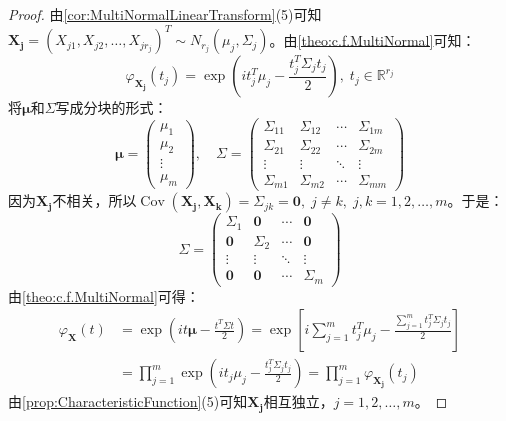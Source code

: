\begin{proof}
	由\cref{cor:MultiNormalLinearTransform}(5)可知$\mathbf{X_j}=(X_{j1},X_{j2},\dots,X_{jr_j})^T\sim N_{r_j}(\mu_j,\Sigma_j)$。由\cref{theo:c.f.MultiNormal}可知：
	\begin{equation*}
		\varphi_\mathbf{X_j}(t_j)=\exp\left(it_j^T\mu_j-\frac{t_j^T\Sigma_j t_j}{2}\right),\;t_j\in\mathbb{R}^{r_j}
	\end{equation*}
	将$\boldsymbol{\mu}$和$\Sigma$写成分块的形式：
	\begin{equation*}
		\boldsymbol{\mu}=
		\begin{pmatrix} 
			\mu_1 \\ 
			\mu_2 \\ 
			\vdots \\ 
			\mu_m 
		\end{pmatrix},\quad
		\Sigma=
		\begin{pmatrix}
			\Sigma_{11} & \Sigma_{12} & \cdots & \Sigma_{1m} \\
			\Sigma_{21} & \Sigma_{22} & \cdots & \Sigma_{2m} \\
			\vdots & \vdots & \ddots & \vdots \\
			\Sigma_{m1} & \Sigma_{m2} & \cdots & \Sigma_{mm}
		\end{pmatrix}
	\end{equation*}
	因为$\mathbf{X_j}$不相关，所以$\operatorname{Cov}(\mathbf{X_j},\mathbf{X_k})=\Sigma_{jk}=\mathbf{0},\;j\ne k,\;j,k=1,2,\dots,m$。于是：
	\begin{equation*}
		\Sigma=
		\begin{pmatrix}
			\Sigma_1 & \mathbf{0} & \cdots & \mathbf{0} \\
			\mathbf{0} & \Sigma_2 & \cdots & \mathbf{0} \\
			\vdots & \vdots & \ddots & \vdots \\
			\mathbf{0} & \mathbf{0} & \cdots & \Sigma_m
		\end{pmatrix}
	\end{equation*}
	由\cref{theo:c.f.MultiNormal}可得：
	\begin{align*}
		\varphi_\mathbf{X}(t)
		&=\exp\left(it\boldsymbol{\mu}-\frac{t^T\Sigma t}{2}\right)
		=\exp\left[i\sum_{j=1}^{m}t_j^T\mu_j-\frac{\sum\limits_{j=1}^{m}t_j^T\Sigma_j t_j}{2}\right] \\
		&=\prod_{j=1}^m\exp\left(it_j\mu_j-\frac{t_j^T\Sigma_j t_j}{2}\right)=\prod_{j=1}^m\varphi_\mathbf{X_j}(t_j)
	\end{align*}
	由\cref{prop:CharacteristicFunction}(5)可知$\mathbf{X_j}$相互独立，$j=1,2,\dots,m$。
\end{proof}
